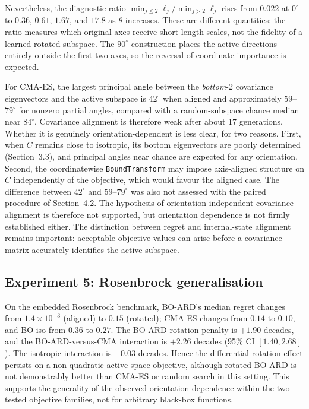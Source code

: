 \documentclass[11pt,a4paper]{article}
\begin{document}
Nevertheless, the diagnostic ratio $\min_{j\le2}\ell_j/\min_{j>2}\ell_j$ rises from $0.022$ at $0^\circ$ to $0.36$, $0.61$, $1.67$, and $17.8$ as $\theta$ increases. These are different quantities: the ratio measures which original axes receive short length scales, not the fidelity of a learned rotated subspace. The $90^\circ$ construction places the active directions entirely outside the first two axes, so the reversal of coordinate importance is expected.

For CMA-ES, the largest principal angle between the \emph{bottom}-2 covariance eigenvectors and the active subspace is $42^\circ$ when aligned and approximately $59$--$79^\circ$ for nonzero partial angles, compared with a random-subspace chance median near $84^\circ$. Covariance alignment is therefore weak after about 17 generations. Whether it is genuinely orientation-dependent is less clear, for two reasons. First, when $C$ remains close to isotropic, its bottom eigenvectors are poorly determined (Section~3.3), and principal angles near chance are expected for any orientation. Second, the coordinatewise \texttt{BoundTransform} may impose axis-aligned structure on $C$ independently of the objective, which would favour the aligned case. The difference between $42^\circ$ and $59$--$79^\circ$ was also not assessed with the paired procedure of Section~4.2. The hypothesis of orientation-independent covariance alignment is therefore not supported, but orientation dependence is not firmly established either. The distinction between regret and internal-state alignment remains important: acceptable objective values can arise before a covariance matrix accurately identifies the active subspace.

\subsection{Experiment 5: Rosenbrock generalisation}
On the embedded Rosenbrock benchmark, BO-ARD's median regret changes from $1.4\times10^{-3}$ (aligned) to $0.15$ (rotated); CMA-ES changes from $0.14$ to $0.10$, and BO-iso from $0.36$ to $0.27$. The BO-ARD rotation penalty is $+1.90$ decades, and the BO-ARD-versus-CMA interaction is $+2.26$ decades (95\% CI $[1.40,2.68]$). The isotropic interaction is $-0.03$ decades. Hence the differential rotation effect persists on a non-quadratic active-space objective, although rotated BO-ARD is not demonstrably better than CMA-ES or random search in this setting. This supports the generality of the observed orientation dependence within the two tested objective families, not for arbitrary black-box functions.
\end{document}
